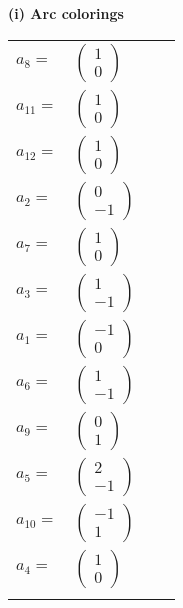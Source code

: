 \documentclass[1p]{elsarticle_modified}
\theoremstyle{definition}
\begin{document}
\flushleft \textbf{(i) Arc colorings}\\
\begin{tabular}{m{7pt} m{180pt} m{7pt} m{180pt} }
\flushright $a_{8}=$&$\begin{pmatrix}1\\0\end{pmatrix}$ \\
\flushright $a_{11}=$&$\begin{pmatrix}1\\0\end{pmatrix}$ \\
\flushright $a_{12}=$&$\begin{pmatrix}1\\0\end{pmatrix}$ \\
\flushright $a_{2}=$&$\begin{pmatrix}0\\-1\end{pmatrix}$ \\
\flushright $a_{7}=$&$\begin{pmatrix}1\\0\end{pmatrix}$ \\
\flushright $a_{3}=$&$\begin{pmatrix}1\\-1\end{pmatrix}$ \\
\flushright $a_{1}=$&$\begin{pmatrix}-1\\0\end{pmatrix}$ \\
\flushright $a_{6}=$&$\begin{pmatrix}1\\-1\end{pmatrix}$ \\
\flushright $a_{9}=$&$\begin{pmatrix}0\\1\end{pmatrix}$ \\
\flushright $a_{5}=$&$\begin{pmatrix}2\\-1\end{pmatrix}$ \\
\flushright $a_{10}=$&$\begin{pmatrix}-1\\1\end{pmatrix}$ \\
\flushright $a_{4}=$&$\begin{pmatrix}1\\0\end{pmatrix}$\\&\end{tabular}
\end{document}
